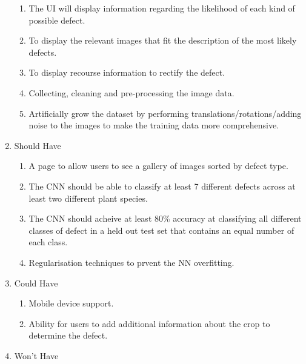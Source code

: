 \begin{enumerate}
\begin{enumerate}
  	\item The UI will display information regarding the likelihood of each kind of possible defect.
  	\item To display the relevant images that fit the description of the most likely defects.
  	\item To display recourse information to rectify the defect.
  	\item Collecting, cleaning and pre-processing the image data.
    \item Artificially grow the dataset by performing translations/rotations/adding noise to the images to make the training data more comprehensive.
  \end{enumerate}
  \item Should Have
  \begin{enumerate}
    \item A page to allow users to see a gallery of images sorted by
      defect type.
    \item The CNN should be able to classify at least 7 different defects across at least two different plant species.
    \item The CNN should acheive at least 80\% accuracy at classifying all different classes of defect in a held out test set that contains an equal number of each class.
  	\item Regularisation techniques to prvent the NN overfitting.
  \end{enumerate}
  \item Could Have
  \begin{enumerate}
      \item Mobile device support.
    \item Ability for users to add additional information about the crop
      to determine the defect.
  \end{enumerate}
  \item Won't Have
\end{enumerate}


